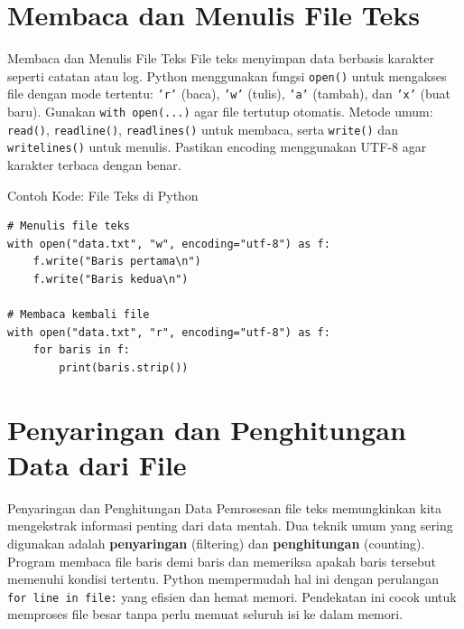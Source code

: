 \documentclass[aspectratio=169, table]{beamer}
\begin{document}
\section{Membaca dan Menulis File Teks}

\begin{frame}{Membaca dan Menulis File Teks}
\vspace{20pt}
File teks menyimpan data berbasis karakter seperti catatan atau log.  
Python menggunakan fungsi \texttt{open()} untuk mengakses file dengan mode tertentu:  
\texttt{'r'} (baca), \texttt{'w'} (tulis), \texttt{'a'} (tambah), dan \texttt{'x'} (buat baru).  
Gunakan \texttt{with open(...)} agar file tertutup otomatis.  
Metode umum: \texttt{read()}, \texttt{readline()}, \texttt{readlines()} untuk membaca,  
serta \texttt{write()} dan \texttt{writelines()} untuk menulis.  
Pastikan encoding menggunakan UTF-8 agar karakter terbaca dengan benar.
\end{frame}

\begin{frame}[fragile]{Contoh Kode: File Teks di Python}
\vspace{20pt}
\begin{lstlisting}[style=PythonStyle]
# Menulis file teks
with open("data.txt", "w", encoding="utf-8") as f:
    f.write("Baris pertama\n")
    f.write("Baris kedua\n")

# Membaca kembali file
with open("data.txt", "r", encoding="utf-8") as f:
    for baris in f:
        print(baris.strip())
\end{lstlisting}
\end{frame}

\section{Penyaringan dan Penghitungan Data dari File}

\begin{frame}{Penyaringan dan Penghitungan Data}
\vspace{20pt}
Pemrosesan file teks memungkinkan kita mengekstrak informasi penting dari data mentah.  
Dua teknik umum yang sering digunakan adalah \textbf{penyaringan} (filtering) dan \textbf{penghitungan} (counting).  
Program membaca file baris demi baris dan memeriksa apakah baris tersebut memenuhi kondisi tertentu.  
Python mempermudah hal ini dengan perulangan \texttt{for line in file:} yang efisien dan hemat memori.  
Pendekatan ini cocok untuk memproses file besar tanpa perlu memuat seluruh isi ke dalam memori.
\end{frame}
\end{document}
